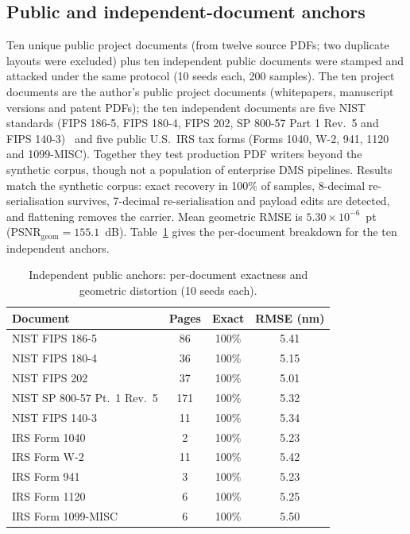 \documentclass[journal]{IEEEtran}
\begin{document}
\subsection{Public and independent-document anchors}
Ten unique public project documents (from twelve source PDFs; two duplicate layouts were excluded) plus ten independent public documents were stamped and attacked under the same protocol (10 seeds each, 200 samples). The ten project documents are the author's public project documents (whitepapers, manuscript versions and patent PDFs); the ten independent documents are five NIST standards (FIPS 186-5, FIPS 180-4, FIPS 202, SP 800-57 Part 1 Rev.~5 and FIPS 140-3)~\cite{fips1865,fips1804,fips202,nist80057,fips1403} and five public U.S.\ IRS tax forms (Forms 1040, W-2, 941, 1120 and 1099-MISC). Together they test production PDF writers beyond the synthetic corpus, though not a population of enterprise DMS pipelines. Results match the synthetic corpus: exact recovery in 100\% of samples, 8-decimal re-serialisation survives, 7-decimal re-serialisation and payload edits are detected, and flattening removes the carrier. Mean geometric RMSE is $5.30\times10^{-6}$~pt (PSNR$_{\text{geom}}=155.1$~dB). Table~\ref{tab:independent} gives the per-document breakdown for the ten independent anchors.

\begin{table}[t]
\centering
\footnotesize
\caption{Independent public anchors: per-document exactness and geometric distortion (10 seeds each).}
\label{tab:independent}
\begin{tabular}{@{}lccc@{}}
\toprule
Document & Pages & Exact & RMSE (nm) \\
\midrule
NIST FIPS 186-5 & 86 & 100\% & 5.41 \\
NIST FIPS 180-4 & 36 & 100\% & 5.15 \\
NIST FIPS 202 & 37 & 100\% & 5.01 \\
NIST SP 800-57 Pt.~1 Rev.~5 & 171 & 100\% & 5.32 \\
NIST FIPS 140-3 & 11 & 100\% & 5.34 \\
IRS Form 1040 & 2 & 100\% & 5.23 \\
IRS Form W-2 & 11 & 100\% & 5.42 \\
IRS Form 941 & 3 & 100\% & 5.23 \\
IRS Form 1120 & 6 & 100\% & 5.25 \\
IRS Form 1099-MISC & 6 & 100\% & 5.50 \\
\bottomrule
\end{tabular}
\end{table}
\end{document}
